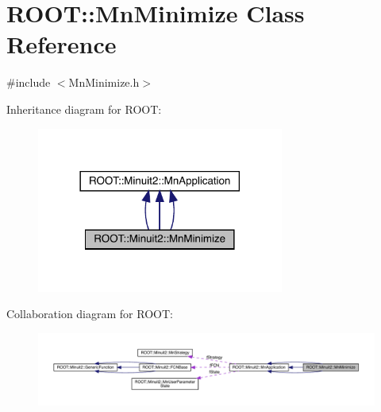 \hypertarget{classROOT_1_1Minuit2_1_1MnMinimize}{}\section{R\+O\+OT\+:\+:Mn\+Minimize Class Reference}
\label{classROOT_1_1Minuit2_1_1MnMinimize}


{\ttfamily \#include $<$Mn\+Minimize.\+h$>$}



Inheritance diagram for R\+O\+OT\+:
\nopagebreak
\begin{figure}[H]
\begin{center}
\leavevmode
\includegraphics[width=230pt]{d2/df5/classROOT_1_1Minuit2_1_1MnMinimize__inherit__graph}
\end{center}
\end{figure}


Collaboration diagram for R\+O\+OT\+:
\nopagebreak
\begin{figure}[H]
\begin{center}
\leavevmode
\includegraphics[width=350pt]{d0/dfd/classROOT_1_1Minuit2_1_1MnMinimize__coll__graph}
\end{center}
\end{figure}
